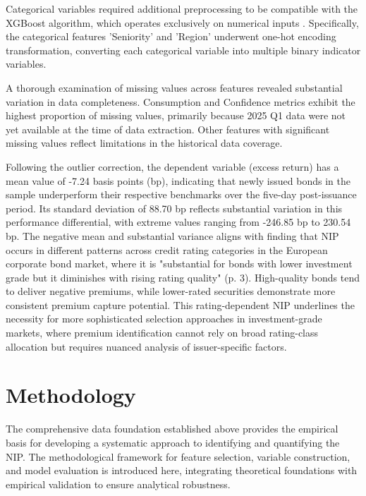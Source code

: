 Categorical variables required additional preprocessing to be compatible with the XGBoost algorithm, which operates exclusively on numerical inputs \parencite{Harrison2023EffectiveModels}. Specifically, the categorical features 'Seniority' and 'Region' underwent one-hot encoding transformation, converting each categorical variable into multiple binary indicator variables.

A thorough examination of missing values across features revealed substantial variation in data completeness. Consumption and Confidence metrics exhibit the highest proportion of missing values, primarily because 2025 Q1 data were not yet available at the time of data extraction. Other features with significant missing values reflect limitations in the historical data coverage.

Following the outlier correction, the dependent variable (excess return) has a mean value of -7.24 basis points (bp), indicating that newly issued bonds in the sample underperform their respective benchmarks over the five-day post-issuance period. Its standard deviation of 88.70 bp reflects substantial variation in this performance differential, with extreme values ranging from -246.85 bp to 230.54 bp. The negative mean and substantial variance aligns with \textcite{Traczyk2024NewFactor} finding that NIP occurs in different patterns across credit rating categories in the European corporate bond market, where it is "substantial for bonds with lower investment grade but it diminishes with rising rating quality" (p. 3). High-quality bonds tend to deliver negative premiums, while lower-rated securities demonstrate more consistent premium capture potential. This rating-dependent NIP underlines the necessity for more sophisticated selection approaches in investment-grade markets, where premium identification cannot rely on broad rating-class allocation but requires nuanced analysis of issuer-specific factors.

\section{Methodology}
\label{sec:methodology}


The comprehensive data foundation established above provides the empirical basis for developing a systematic approach to identifying and quantifying the NIP. The methodological framework for feature selection, variable construction, and model evaluation is introduced here, integrating theoretical foundations with empirical validation to ensure analytical robustness.

